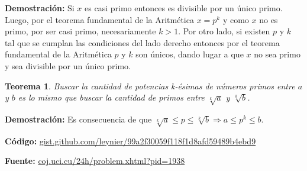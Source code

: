 \documentclass[12pt]{article}
\newcommand{\proof}{\textbf{Demostración:} }
\newcommand{\nl}{\vspace{0.3cm}}
\newtheorem{theorem}{Teorema}
\begin{document}
\proof Si $x$ es casi primo entonces es divisible por un único primo. Luego, por el teorema fundamental de la Aritmética $x = p^k$ y como $x$ no es primo, por ser casi primo, necesariamente $k > 1$. Por otro lado, si existen $p$ y $k$ tal que se cumplan las condiciones del lado derecho entonces por el teorema fundamental de la Aritmética $p$ y $k$ son únicos, dando lugar a que $x$ no sea primo y sea divisible por un único primo.

\begin{theorem}
	Buscar la cantidad de potencias k-ésimas de números primos entre $a$ y $b$ es lo mismo que buscar la cantidad de primos entre $\sqrt[k]{a}$ y $\sqrt[k]{b}$.
\end{theorem}

\proof Es consecuencia de que $\sqrt[k]{a} \leqslant p \leqslant \sqrt[k]{b} \Rightarrow a \leqslant p^k \leqslant b$.

\nl

\textbf{Código:} \href{https://gist.github.com/leynier/99a2f30059f118f1d8afd59489b4ebd9}{gist.github.com/leynier/99a2f30059f118f1d8afd59489b4ebd9}

\nl

\textbf{Fuente:} \href{http://coj.uci.cu/24h/problem.xhtml?pid=1938}{coj.uci.cu/24h/problem.xhtml?pid=1938}
 
\nocite{*}


\end{document}
